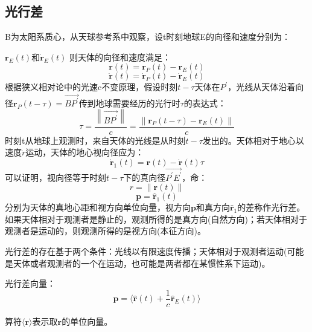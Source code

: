\subsection{光行差}
B为太阳系质心，从天球参考系中观察，设t时刻地球E的向径和速度分别为：

$\boldsymbol{r}_{E}(t)$和$\dot{\boldsymbol{r}}_{E}(t)$
则天体的向径和速度满足：
\begin{equation}
	\boldsymbol{r}(t)=\boldsymbol{r}_{P}(t)-\boldsymbol{r}_{E}(t)
\end{equation}
\begin{equation}
	\dot{\boldsymbol{r}}(t)=\dot{\boldsymbol{r}}_{P}(t)-\dot{\boldsymbol{r}}_{E}(t)
\end{equation}
根据狭义相对论中的光速c不变原理，假设时刻$t-\tau$天体在$P^\prime$，光线从天体沿着向径$\boldsymbol{r}_{P}(t-\tau)=\overrightarrow{BP^\prime}$传到地球需要经历的光行时$\tau$的表达式：
\begin{equation}
	\tau=\frac{\left\|\overrightarrow{BP^\prime}\right\|}{c}=\frac{\left\|\boldsymbol{r}_{P}(t-\tau)-\boldsymbol{r}_{E}(t)\right\|}{c}
\end{equation}
时刻t从地球上观测时，来自天体的光线是从时刻$t-\tau$发出的。天体相对于地心以速度$\dot{r}$运动，天体的地心视向径应为：
\begin{equation}
	\boldsymbol{\dot{r}}_{1}(t)=\boldsymbol{r}(t)-\boldsymbol{\dot{r}}(t)\tau
\end{equation}
可以证明，视向径等于时刻$t-\tau$下的真向径$\overrightarrow{P^\prime E^\prime}$，命：
\begin{equation}
	r=\left\| \boldsymbol{r}(t)\right\|
\end{equation}
\begin{equation}
	\boldsymbol{p}=\boldsymbol{\hat{r}}_{1}(t)
\end{equation}
分别为天体的真地心距和视方向单位向量，视方向$\boldsymbol{p}$和真方向$\boldsymbol{\hat{r}}_{1}$的差称作光行差。如果天体相对于观测者是静止的，观测所得的是真方向(自然方向)；若天体相对于观测者是运动的，则观测所得的是视方向(本征方向)。

光行差的存在基于两个条件：光线以有限速度传播；天体相对于观测者运动(可能是天体或者观测者的一个在运动，也可能是两者都在某惯性系下运动)。

光行差向量：
\begin{equation}
	\boldsymbol{p}=\langle\boldsymbol{\hat{r}}(t)+\frac{1}{c}\boldsymbol{\hat{r}}_{E}(t)\rangle
\end{equation}

算符$\langle\boldsymbol{r}\rangle$表示取$\boldsymbol{r}$的单位向量。

